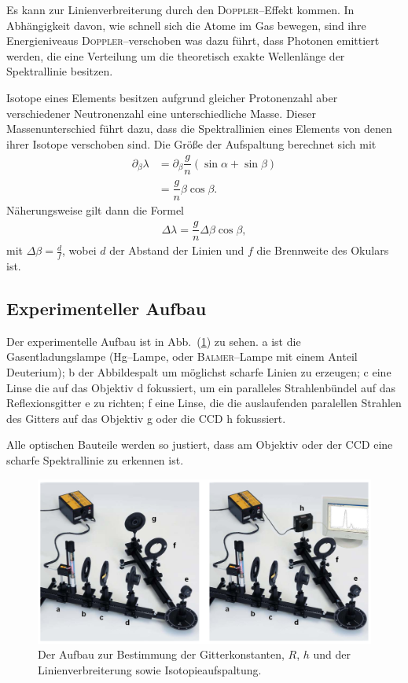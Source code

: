 \documentclass[sn-mathphys-num,iicol]{sn-jnl}
\theoremstyle{thmstyleone}
\theoremstyle{thmstyletwo}
\theoremstyle{thmstylethree}
\begin{document}
Es kann zur Linienverbreiterung durch den \textsc{Doppler}--Effekt kommen.
In Abhängigkeit davon, wie schnell sich die Atome im Gas bewegen, sind ihre Energieniveaus \textsc{Doppler}--verschoben was dazu führt, dass Photonen emittiert werden, die eine Verteilung um die theoretisch exakte Wellenlänge der Spektrallinie besitzen.

Isotope eines Elements besitzen aufgrund gleicher Protonenzahl aber verschiedener Neutronenzahl eine unterschiedliche Masse.
Dieser Massenunterschied führt dazu, dass die Spektrallinien eines Elements von denen ihrer Isotope verschoben sind.
Die Größe der Aufspaltung berechnet sich mit 
\begin{align} 
         &&&& \partial _\beta \lambda  &= \partial _\beta\dfrac{g}{n}\left(\sin \alpha +\sin \beta \right)  &&&& \\
          &&&&  &= \dfrac{g}{n}\beta \cos \beta .  &&&& 
\end{align} 
Näherungsweise gilt dann die Formel
\begin{align} 
        \Delta \lambda =\dfrac{g}{n}\Delta \beta \cos \beta
,\end{align} 
mit $\Delta \beta =\tfrac{d}{f}$, wobei $d$ der Abstand der Linien und $f$ die Brennweite des Okulars ist.

\subsection{Experimenteller Aufbau}
Der experimentelle Aufbau ist in Abb.\ (\ref{fig:aufbau_spektrallinie}) zu sehen.
a ist die Gasentladungslampe (Hg--Lampe, oder \textsc{Balmer}--Lampe mit einem Anteil Deuterium); b der Abbildespalt um möglichst scharfe Linien zu erzeugen; c eine Linse die auf das Objektiv d fokussiert, um ein paralleles Strahlenbündel auf das Reflexionsgitter e zu richten; f eine Linse, die die auslaufenden paralellen Strahlen des Gitters auf das Objektiv g oder die CCD h fokussiert.

Alle optischen Bauteile werden so justiert, dass am Objektiv oder der CCD eine scharfe Spektrallinie zu erkennen ist.
\begin{figure}[t]
        \centering
        \includegraphics[width=.5\textwidth]{402_aufbau_spektrallinie.png}
        \caption{Der Aufbau zur Bestimmung der Gitterkonstanten, $R$, $h$ und der Linienverbreiterung sowie Isotopieaufspaltung.\cite{Anleitung402}} \label{fig:aufbau_spektrallinie}
\end{figure}
\end{document}
